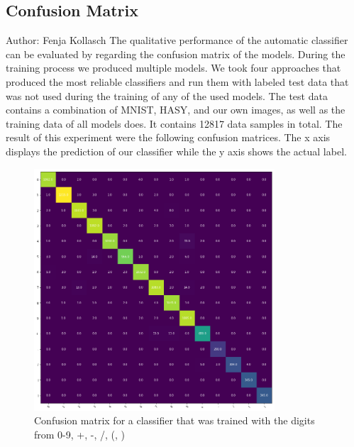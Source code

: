 \documentclass[12pt]{article}
\begin{document}
	
	
	
	
	
	\subsection{Confusion Matrix}
	\small{Author: Fenja Kollasch} \newline \newline
	The qualitative performance of the automatic classifier can be evaluated by regarding the confusion matrix of the models. During the training process we produced multiple models. We took four approaches that produced the most reliable classifiers and run them with labeled test data that was not used during the training of any of the used models. The test data contains a combination of MNIST, HASY, and our own images, as well as the training data of all models does. It contains 12817 data samples in total. The result of this experiment were the following confusion matrices. The x axis displays the prediction of our classifier while the y axis shows the actual label.
	
	\begin{figure}[H]
		\includegraphics[width=0.8\textwidth]{ImagesForReport/confusion_matrix_all.png}
		\caption{Confusion matrix for a classifier that was trained with the digits from 0-9, +, -, /, (, )}
		\label{fig:mat-all}
	\end{figure}
	
\end{document}
